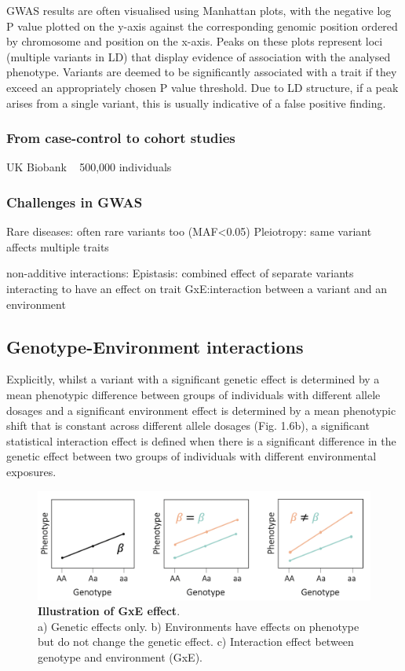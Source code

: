 \cite{mccarthy2008genome}

GWAS results are often visualised using Manhattan plots, with the negative log P value plotted on the y-axis against the corresponding genomic position ordered by chromosome and position on the x-axis. 
Peaks on these plots represent loci (multiple variants in LD) that display evidence of association with the analysed phenotype. 
Variants are deemed to be significantly associated with a trait if they exceed an appropriately chosen P value threshold. Due to LD structure, if a peak arises from a single variant, this is usually indicative of a false positive finding.

\subsubsection{From case-control to cohort studies}

UK Biobank ~ 500,000 individuals

\subsubsection{Challenges in GWAS}

Rare diseases: often rare variants too (MAF<0.05)
Pleiotropy: same variant affects multiple traits

non-additive interactions:
Epistasis: combined effect of separate variants interacting to have an effect on trait
GxE:interaction between a variant and an environment


\subsection{Genotype-Environment interactions}

Explicitly, whilst a variant with a significant genetic effect is determined by a mean phenotypic difference between groups of individuals with different allele dosages and a significant environment effect is determined by a mean phenotypic shift that is constant across different allele dosages (Fig. 1.6b), a significant statistical interaction effect is defined when there is a significant difference in the genetic effect between two groups of individuals with different environmental exposures.

\begin{figure}[h]
\centering
\includegraphics[width=15cm]{Chapter1/Fig/GxE.png}
\caption{\textbf{Illustration of GxE effect}.\\
a) Genetic effects only. b) Environments have effects on phenotype but do not change the genetic effect. c) Interaction effect between genotype and environment (GxE).}
\end{figure}

